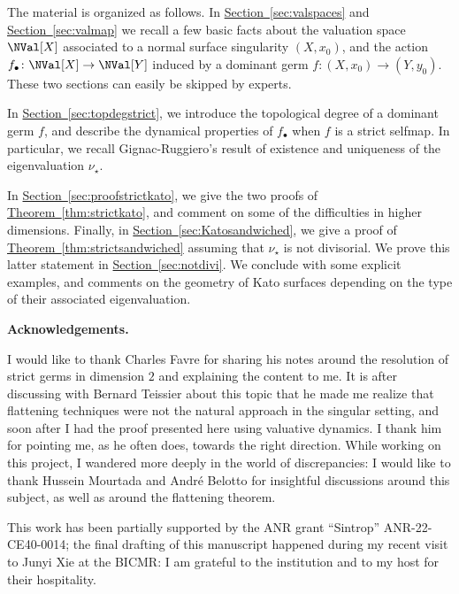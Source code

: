 \documentclass[11 pt, twoside, a4paper]{amsart}
\theoremstyle{definition}
\theoremstyle{definition}
\newcommand{\refthm}[1]{\hyperref[thm:#1]{Theorem~\ref*{thm:#1}}}
\newcommand{\refsec}[1]{\hyperref[sec:#1]{Section~\ref*{sec:#1}}}
\begin{document}
\medskip

The material is organized as follows. In \refsec{valspaces} and \refsec{valmap} we recall a few basic facts about the valuation space $\NVal[X]$ associated to a normal surface singularity $(X,x_0)$, and the action $f_\bullet \colon \NVal[X] \to \NVal[Y]$ induced by a dominant germ $f \colon (X,x_0) \to (Y,y_0)$. These two sections can easily be skipped by experts.

In \refsec{topdegstrict}, we introduce the topological degree of a dominant germ $f$, and describe the dynamical properties of $f_\bullet$ when $f$ is a strict selfmap. In particular, we recall Gignac-Ruggiero's result of existence and uniqueness of the eigenvaluation $\nu_\star$.

In \refsec{proofstrictkato}, we give the two proofs of \refthm{strictkato}, and comment on some of the difficulties in higher dimensions.
Finally, in \refsec{Katosandwiched}, we give a proof of \refthm{strictsandwiched} assuming that $\nu_\star$ is not divisorial. We prove this latter statement in \refsec{notdivi}.
We conclude with some explicit examples, and comments on the geometry of Kato surfaces depending on the type of their associated eigenvaluation.


\bigskip

\noindent\textbf{Acknowledgements.}

I would like to thank Charles Favre for sharing his notes around the resolution of strict germs in dimension $2$ and explaining the content to me.
It is after discussing with Bernard Teissier about this topic that he made me realize that flattening techniques were not the natural approach in the singular setting, and soon after I had the proof presented here using valuative dynamics.
I thank him for pointing me, as he often does, towards the right direction.
While working on this project, I wandered more deeply in the world of discrepancies: I would like to thank Hussein Mourtada and André Belotto for insightful discussions around this subject, as well as around the flattening theorem.

This work has been partially supported by the ANR grant ``Sintrop'' ANR-22-CE40-0014; the final drafting of this manuscript happened during my recent visit to Junyi Xie at the BICMR:
I am grateful to the institution and to my host for their hospitality. 
\end{document}
